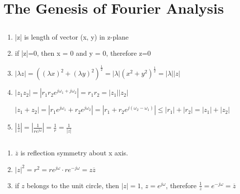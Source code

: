 \documentclass[a4paper]{article}
\begin{document}
\section{The Genesis of Fourier Analysis}
\subsection{}
\begin{enumerate}[label=(\alph*)]
    \item |z| is length of vector (x, y) in z-plane
    \item if |z|=0, then x = 0 and y = 0, therefore z=0
    \item $|\lambda z|=((\lambda x)^2+(\lambda y)^2)^{\frac{1}{2}} = |\lambda|(x^2+y^2)^{\frac{1}{2}}=|\lambda| |z|$
    \item $|z_1z_2|=|r_1r_2e^{j\omega_1+j\omega_2}|=r_1r_2=|z_1| |z_2|$

        $|z_1+z_2|=|r_1e^{j\omega_1}+r_2e^{j\omega_2}|=|r_1+r_2e^{j(\omega_2-\omega_1)}|\le |r_1| +|r_2| =|z_1|+|z_2|$
    \item $|\frac{1}{z}|=|\frac{1}{re^{j\omega}}|=\frac{1}{r}=\frac{1}{|z|}$
\end{enumerate}
\subsection{}
\begin{enumerate}[label=(\alph*)]
    \item $\overline{z}$ is reflection symmetry about x axis.
    \item $|z|^2=r^2=re^{j\omega}\cdot re^{-j\omega}=z\overline{z}$
    \item if $z$ belongs to the unit circle, then $|z|=1$, $z=e^{j\omega}$, therefore $\frac{1}{z}=e^{-j\omega}=\overline{z}$
\end{enumerate}
\end{document}

